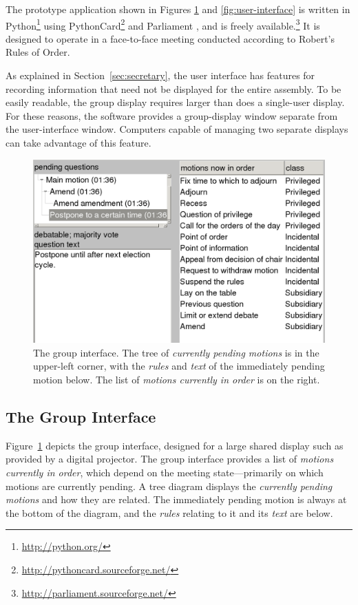 \documentclass{acm_proc_article-sp}
\begin{document}
The prototype application shown in Figures \ref{fig:group-interface} and \ref{fig:user-interface} is written in Python\footnote{\url{http://python.org/}} using PythonCard\footnote{\url{http://pythoncard.sourceforge.net/}} and Parliament \cite{shanks:parliament}, and is freely available.\footnote{\url{http://parliament.sourceforge.net/}} It is designed to operate in a face-to-face meeting conducted according to Robert's Rules of Order.

As explained in Section~\ref{sec:secretary}, the user interface has features for recording information that need not be displayed for the entire assembly. To be easily readable, the group display requires larger than does a single-user display. For these reasons, the software provides a group-display window separate from the user-interface window. Computers capable of managing two separate displays can take advantage of this feature.

\begin{figure}[t]
\includegraphics[scale=.42]{group}
\caption{The group interface. The tree of \emph{currently pending motions} is in the upper-left corner, with the \emph{rules} and \emph{text} of the immediately pending motion below. The list of \emph{motions currently in order} is on the right.}
\label{fig:group-interface}
\end{figure}

\subsection{The Group Interface}

Figure~\ref{fig:group-interface} depicts the group interface, designed for a large shared display such as provided by a digital projector. The group interface provides a list of \emph{motions currently in order}, which depend on the meeting state---primarily on which motions are currently pending. A tree diagram displays the \emph{currently pending motions} and how they are related. The immediately pending motion is always at the bottom of the diagram, and the \emph{rules} relating to it and its \emph{text} are below.
\end{document}
